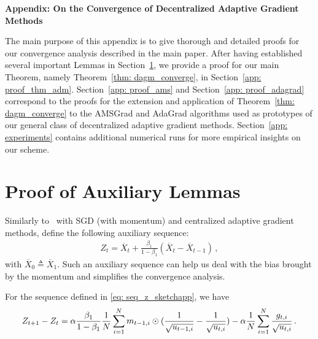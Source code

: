 \documentclass[anon,12pt]{colt2021} %
\begin{document}
\clearpage

%



\clearpage
\appendix

{\centering
 {\Large\bfseries
Appendix: On the Convergence of Decentralized Adaptive Gradient Methods\par}}


\vspace{0.1in}

The main purpose of this appendix is to give thorough and detailed proofs for our convergence analysis described in the main paper.
After having established several important Lemmas in Section~\ref{app: proof_lemmas}, we provide a proof for our main Theorem, namely Theorem~\ref{thm: dagm_converge}, in Section~\ref{app: proof_thm_adm}.
Section~\ref{app: proof_ams} and Section~\ref{app: proof_adagrad} correspond to the proofs for the extension and application of Theorem~\ref{thm: dagm_converge} to the AMSGrad and AdaGrad algorithms used as prototypes of our general class of decentralized adaptive gradient methods.
Section~\ref{app: experiments} contains additional numerical runs for more empirical insights on our scheme.

\section{Proof of Auxiliary Lemmas} \label{app: proof_lemmas}

Similarly to~\cite{yan2018unified, chen2018convergence} with SGD (with momentum) and centralized adaptive gradient methods, define the following auxiliary sequence:
\begin{align}\label{eq: seq_z_sketchapp}
Z_{t} = \overline X_t + \frac{\beta_1}{1-\beta_1} (\overline X_t - \overline X_{t-1}) \, ,
\end{align}
with $\overline X_{0} \triangleq \overline X_1$.
Such an auxiliary sequence can help us deal with the bias brought by the momentum and simplifies the convergence analysis. 

\begin{lemma}\label{lem: z_diff} 
	For the sequence defined in \eqref{eq: seq_z_sketchapp}, we have
	\begin{align}\notag
	Z_{t+1} - Z_t = \alpha \frac{\beta_1}{1-\beta_1}  \frac{1}{N} \sum_{i=1}^N m_{t-1	,i} \odot (\frac{1}{\sqrt{u_{t-1,i}}} - \frac{1}{\sqrt{u_{t,i}}}) 
	- \alpha \frac{1}{N} \sum_{i=1}^N \frac{g_{t,i}}{\sqrt{u_{t,i}}} \, .
	\end{align}
\end{lemma}
\end{document}
